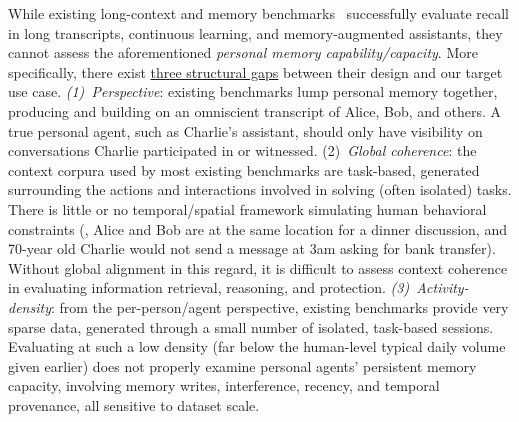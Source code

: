 While existing long-context and memory benchmarks~\citep{maharana2024evaluating,wu2025longmemeval,memorybench2025} successfully evaluate recall in long transcripts, continuous learning, and memory-augmented assistants, they cannot assess the aforementioned \textit{personal memory capability/capacity}.
More specifically, there exist \underline{three structural gaps} between their design and our target use case.
\emph{(1)~Perspective}: existing benchmarks lump personal memory together, producing and building on an omniscient transcript of Alice, Bob, and others.
A true personal agent, such as Charlie's assistant, should only have visibility on conversations Charlie participated in or witnessed. 
(2)~\emph{Global coherence}: the context corpura used by most existing benchmarks are task-based, generated surrounding the actions and interactions involved in solving (often isolated) tasks. There is little or no temporal/spatial framework simulating human behavioral constraints (\eg, Alice and Bob are at the same location for a dinner discussion, and 70-year old Charlie would not send a message at 3am asking for bank transfer). Without global alignment in this regard, it is difficult to assess context coherence in evaluating information retrieval, reasoning, and protection. 
\emph{(3)~Activity-density}: from the per-person/agent perspective, existing benchmarks provide very sparse data, generated through  a small number of isolated, task-based sessions. 
Evaluating at such a low density (far below the human-level typical daily volume given earlier) does not properly examine personal agents' persistent memory capacity, involving memory writes, interference, recency, and temporal provenance, all sensitive to dataset scale.

